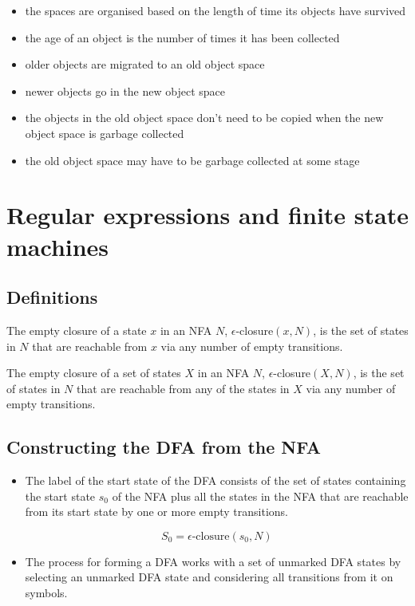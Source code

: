 \documentclass[fontsize=10pt,a4paper]{article}
\begin{document}
\begin{multicols}{3}
    \begin{itemize}
        \item the spaces are organised based on the length of time its objects have survived
        \item the age of an object is the number of times it has been collected
        \item older objects are migrated to an old object space
        \item newer objects go in the new object space
        \item the objects in the old object space don’t need to be copied when the new object space is garbage collected
        \item the old object space may have to be garbage collected at some stage
    \end{itemize}

    \section{Regular expressions and finite state machines}

    \subsection{Definitions}

    The empty closure of a state $x$ in an NFA $N$, $\epsilon$-closure$(x, N)$, is the set of states in $N$ that are reachable from $x$ via any number of empty transitions.

    The empty closure of a set of states $X$ in an NFA $N$, $\epsilon$-closure$(X, N)$, is the set of states in $N$ that are reachable from any of the states in $X$ via any number of empty transitions.

    \subsection{Constructing the DFA from the NFA}

    \begin{itemize}
        \item The label of the start state of the DFA consists of the set of states containing the start state $s_0$ of the NFA plus all the states in the NFA that are reachable from its start state by one or more empty transitions.

        \[S_0 = \epsilon\text{-closure}(s_0, N)\]

        \item The process for forming a DFA works with a set of unmarked DFA states by selecting an unmarked DFA state and considering all transitions from it on symbols.


\end{itemize}
\end{multicols}
\end{document}
